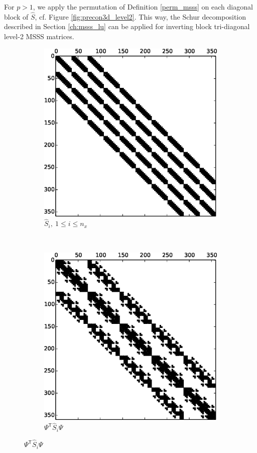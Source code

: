 {For $p>1$, we apply the permutation of Definition \ref{perm_msss} on each diagonal block of $\hat S$, cf. Figure \ref{fig:precon3d_level2}. This way, the Schur decomposition described in Section \ref{ch:msss_lu} can be applied for inverting block tri-diagonal level-2 MSSS matrices.
\begin{figure}[ht]
    \centering
    \begin{subfigure}{0.45\columnwidth}
        \centering
        \includegraphics[width=\textwidth]{Si_p2-crop}
        \caption{$\hat{S}_i, \ 1 \leq i \leq n_x$}
    \end{subfigure}%
    ~ \hfill
    \begin{subfigure}{0.45\columnwidth}
        \centering
        \includegraphics[width=\textwidth]{Si_p2_perm-crop}
        \caption{$\Psi^\mathsf{T} \hat{S}_i \Psi$}
    \end{subfigure}


\end{figure}}
